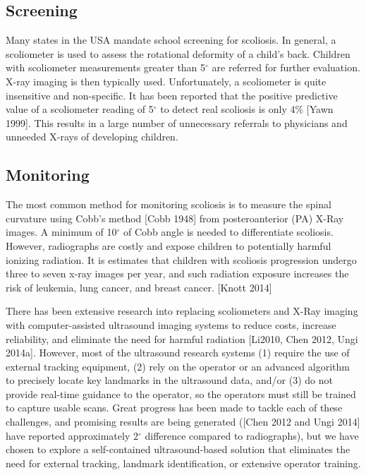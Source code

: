 \documentclass{article}
\begin{document}
\subsection{Screening}
\label{ssec:screen}
Many states in the USA mandate school screening for scoliosis. In general, a scoliometer is used to assess the rotational deformity of a child's back. Children with scoliometer measurements greater than 5$^\circ$ are referred for further evaluation. X-ray imaging is then typically used. Unfortunately, a scoliometer is quite insensitive and non-specific. It has been reported that the positive predictive value of a scoliometer reading of 5$^\circ$ to detect real scoliosis is only 4\% [Yawn 1999]. This results in a large number of unnecessary referrals to physicians and unneeded X-rays of developing children.

\subsection{Monitoring}
\label{ssec:Monitoring}
 The most common method for monitoring scoliosis is to measure the spinal curvature using Cobb's method [Cobb 1948] from posteroanterior (PA) X-Ray images. A minimum of 10$^\circ$ of Cobb angle is needed to differentiate scoliosis.  However, radiographs are costly and expose children to potentially harmful ionizing radiation. It is estimates that children with scoliosis progression undergo three to seven x-ray images per year, and such radiation exposure increases the risk of leukemia, lung cancer, and breast cancer. [Knott 2014]
 
There has been extensive research into replacing scoliometers and X-Ray imaging with computer-assisted ultrasound imaging systems to reduce costs, increase reliability, and eliminate the need for harmful radiation [Li2010, Chen 2012, Ungi 2014a].  However, most of the ultrasound research systems (1) require the use of external tracking equipment, (2) rely on the operator or an advanced algorithm to precisely locate key landmarks in the ultrasound data, and/or (3) do not provide real-time guidance to the operator, so the operators must still be trained to capture usable scans.  Great progress has been made to tackle each of these challenges, and promising results are being generated ([Chen 2012 and Ungi 2014] have reported approximately 2$^\circ$ difference compared to radiographs), but we have chosen to explore a self-contained ultrasound-based solution that eliminates the need for external tracking, landmark identification, or extensive operator training.
\end{document}

